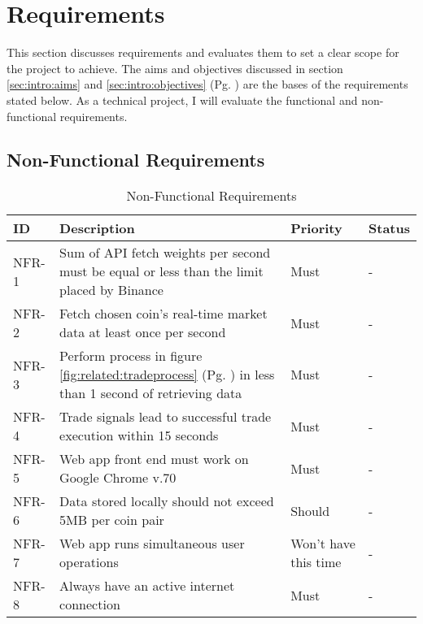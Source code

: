 %
\chapter{Requirements}
\label{sec:requirements}


This section discusses requirements and evaluates them to set a clear scope for the project to achieve. The aims and objectives discussed in section \ref{sec:intro:aims} and \ref{sec:intro:objectives} (Pg. \pageref{sec:intro}) are the bases of the requirements stated below. As a technical project, I will evaluate the functional and non-functional requirements.



\section{Non-Functional Requirements}
\label{sec:requirements:non_func}


\begin{table}[htb!]
\centering
\begin{tabular}{|l|p{}|p{}|l|}
\hline
\textbf{ID} & \textbf{Description} & \textbf{Priority} & \textbf{Status} \\ \hline\hline
NFR-1 & Sum of API fetch weights per second must be equal or less than the limit placed by Binance & Must & - \\ \hline
NFR-2 & Fetch chosen coin's real-time market data at least once per second & Must & - \\ \hline
NFR-3 & Perform process in figure \ref{fig:related:tradeprocess} (Pg. \pageref{fig:related:tradeprocess}) in less than 1 second of retrieving data & Must & - \\ \hline
NFR-4 & Trade signals lead to successful trade execution within 15 seconds & Must & - \\\hline
NFR-5 & Web app front end must work on Google Chrome v.70 & Must & - \\\hline
NFR-6 & Data stored locally should not exceed 5MB per coin pair & Should & - \\ \hline
NFR-7 & Web app runs simultaneous user operations & Won't have this time & - \\\hline
NFR-8 & Always have an active internet connection & Must & - \\\hline
\end{tabular}
\caption{Non-Functional Requirements}
\label{table:requirements:non_func}
\end{table}

